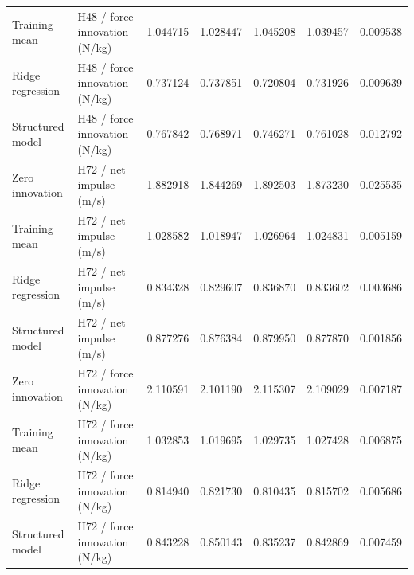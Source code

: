 \begin{longtable}{>{\raggedright\arraybackslash}p{0.80in}>{\raggedright\arraybackslash}p{1.62in}rrrrr}
Training mean & H48 / force innovation (N/kg) & 1.044715 & 1.028447 & 1.045208 & 1.039457 & 0.009538 \\
Ridge regression & H48 / force innovation (N/kg) & 0.737124 & 0.737851 & 0.720804 & 0.731926 & 0.009639 \\
Structured model & H48 / force innovation (N/kg) & 0.767842 & 0.768971 & 0.746271 & 0.761028 & 0.012792 \\
Zero innovation & H72 / net impulse (m/s) & 1.882918 & 1.844269 & 1.892503 & 1.873230 & 0.025535 \\
Training mean & H72 / net impulse (m/s) & 1.028582 & 1.018947 & 1.026964 & 1.024831 & 0.005159 \\
Ridge regression & H72 / net impulse (m/s) & 0.834328 & 0.829607 & 0.836870 & 0.833602 & 0.003686 \\
Structured model & H72 / net impulse (m/s) & 0.877276 & 0.876384 & 0.879950 & 0.877870 & 0.001856 \\
Zero innovation & H72 / force innovation (N/kg) & 2.110591 & 2.101190 & 2.115307 & 2.109029 & 0.007187 \\
Training mean & H72 / force innovation (N/kg) & 1.032853 & 1.019695 & 1.029735 & 1.027428 & 0.006875 \\
Ridge regression & H72 / force innovation (N/kg) & 0.814940 & 0.821730 & 0.810435 & 0.815702 & 0.005686 \\
Structured model & H72 / force innovation (N/kg) & 0.843228 & 0.850143 & 0.835237 & 0.842869 & 0.007459 \\
\end{longtable}
